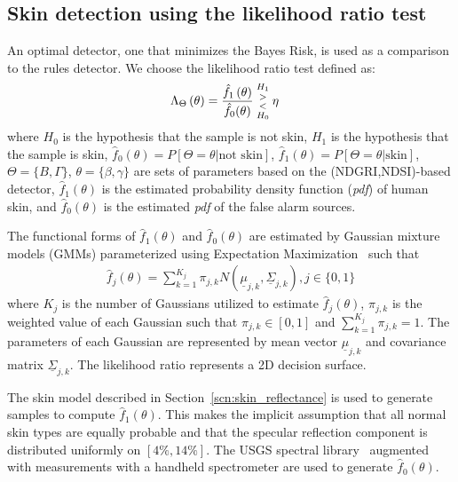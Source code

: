 \documentclass[10pt,journal,cspaper,compsoc]{IEEEtran}
\begin{document}
\subsection{Skin detection using the likelihood ratio test}
\label{scn:lrt}
An optimal detector, one that minimizes the Bayes Risk, is used as a comparison to the rules detector.  We 
choose the likelihood ratio test defined as:
\begin{align}
\label{eqn:lrt}
\Lambda_{\Theta}\left(\theta\right) &= \frac{\hat{f}_{1}\left(\theta\right)}{\hat{f}_{0}(\theta)} {{H_{1} \atop >} \atop {< \atop H_{0}}} \eta
\end{align}
\noindent where $H_0$ is the hypothesis that the sample is not skin, $H_1$ is the hypothesis that the sample is skin, 
$\hat{f}_0(\theta)= P[\Theta=\theta | \mbox{not skin}]$, $\hat{f}_1(\theta) = P[\Theta=\theta| \mbox{skin}]$, 
$\Theta=\{B,\Gamma \}$, $\theta=\{\beta,\gamma \}$ 
are sets of parameters based on the (NDGRI,NDSI)-based detector, $\hat{f}_1(\theta)$ is the estimated probability 
density function (\textit{pdf}) of human skin, and $\hat{f}_0(\theta)$ is the estimated \textit{pdf} of the false alarm sources.

The functional forms of $\hat{f}_1(\theta)$ and $\hat{f}_0(\theta)$ are estimated by Gaussian mixture models (GMMs)
parameterized using Expectation Maximization~\cite{moon96} such that
\begin{align}
\hat{f}_j\left(\theta\right) = \sum_{k=1}^{K_j}\pi_{j,k} N\left(\underline{\mu}_{j,k},\underline{\Sigma}_{j,k}\right), j \in \{0,1\}
\end{align}
\noindent where $K_j$ is the number of Gaussians utilized to estimate $\hat{f}_j\left(\theta\right)$, $\pi_{j,k}$ is the weighted 
value of each Gaussian such that $\pi_{j,k} \in [0,1]$ and $\sum_{k=1}^{K_j}\pi_{j,k} = 1$.  The parameters of each 
Gaussian are represented by mean vector $\underline{\mu}_{j,k}$ and covariance matrix $\underline{\Sigma}_{j,k}$.
The likelihood ratio represents a 2D decision surface.

The skin model described in Section~\ref{scn:skin_reflectance} is used to generate samples to compute $\hat{f}_1\left(\theta\right)$.  This makes 
the implicit assumption that all normal skin types are equally probable and that the specular reflection component is 
distributed uniformly on $\left[4\%,14\%\right]$.  The USGS spectral library~\cite{USGS1} augmented with measurements 
with a handheld spectrometer are used to generate $\hat{f}_0\left(\theta\right)$.
\end{document}
